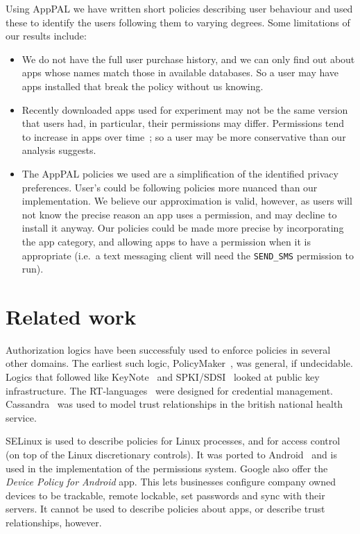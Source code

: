 \documentclass[]{llncs}
\begin{document}
Using AppPAL we have written short policies describing user behaviour and used these to identify the users following them to varying degrees.
Some limitations of our results include:
\begin{itemize}
\item
  We do not have the full user purchase history, and we can only find out about apps whose names match those in available databases.
  So a user may have apps installed that break the policy without us knowing.
\item
  Recently downloaded apps used for experiment may not be the same version that users had, in particular, their permissions may differ.
  Permissions tend to increase in apps over time~\cite{Wei:2012id}; so a user may be more conservative than our analysis suggests.
\item
  The AppPAL policies we used are a simplification of the identified privacy preferences.
  User's could be following policies more nuanced than our implementation.
  We believe our approximation is valid, however, as users will not know the precise reason an app uses a permission, and may decline to install it anyway.
  Our policies could be made more precise by incorporating the app category, and allowing apps to have a permission when it is appropriate (i.e.~a text messaging client will need the \texttt{SEND_SMS} permission to run).
\end{itemize}

\section{Related work}

Authorization logics have been successfuly used to enforce policies in several other domains.
The earliest such logic, PolicyMaker~\cite{Blaze:dj}, was general, if undecidable.
Logics that followed like KeyNote~\cite{Blaze:1999fa} and SPKI/SDSI~\cite{Ellison:1999ui} looked at public key infrastructure.
The RT-languages~\cite{Li:2002if,Li:2003ix,Li:2003to} were designed for credential management.
Cassandra~\cite{Becker:2004fi} was used to model trust relationships in the british national health service.

SELinux is used to describe policies for Linux processes, and for access control (on top of the Linux discretionary controls).
It was ported to Android~\cite{Smalley:2013vl} and is used in the implementation of the permissions system.
Google also offer the \emph{Device Policy for Android} app.
This lets businesses configure company owned devices to be trackable, remote lockable, set passwords and sync with their servers.
It cannot be used to describe policies about apps, or describe trust relationships, however.
\end{document}
